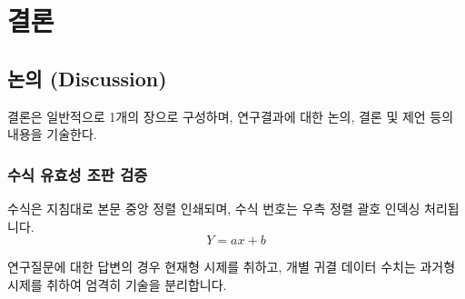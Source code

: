   \chapter{결\quad 론}
  \section{논의 (Discussion)}
  결론은 일반적으로 1개의 장으로 구성하며, 연구결과에 대한 논의, 결론 및 제언 등의 내용을 기술한다.

  \subsection{수식 유효성 조판 검증}
  수식은 지침대로 본문 중앙 정렬 인쇄되며, 수식 번호는 우측 정렬 괄호 인덱싱 처리됩니다.
  \begin{equation}
    Y = ax + b
  \end{equation}

  연구질문에 대한 답변의 경우 현재형 시제를 취하고, 개별 귀결 데이터 수치는 과거형 시제를 취하여 엄격히 기술을 분리합니다.